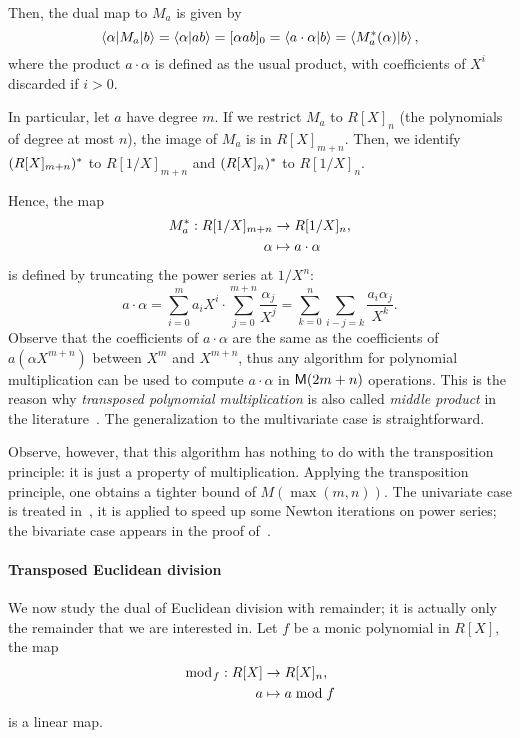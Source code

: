 Then, the dual map to $M_a$ is given by
\begin{equation}
  \label{eq:229}
  \left\langle \alpha \middle| M_a \middle| b \right\rangle = \left\langle \alpha \middle| ab \right\rangle = [\alpha ab]_0 =
  \left\langle a\cdot\alpha \middle| b \right\rangle = \left\langle M_a^\ast(\alpha) \middle| b \right\rangle
  \text{,}
\end{equation}
where the product $a\cdot\alpha$ is defined as the usual product,
with coefficients of $X^i$ discarded if $i>0$.

In particular, let $a$ have degree $m$. If we restrict $M_a$ to
$R[X]_n$ (the polynomials of degree at most $n$), the image of $M_a$
is in $R[X]_{m+n}$. Then, we identify $(R[X]_{m+n})^\ast$ to
$R[1/X]_{m+n}$ and $(R[X]_n)^\ast$ to $R[1/X]_n$. 

Hence, the map 
\begin{equation}
  \label{eq:231}
  \begin{aligned}
    M_a^\ast:R[1/X]_{m+n}&\rightarrow R[1/X]_n\text{,}\\
    \alpha&\mapsto a\cdot\alpha  
  \end{aligned}
\end{equation}
is defined by truncating the power series at $1/X^n$:
\begin{equation}
  \label{eq:230}
  a\cdot\alpha = \sum_{i=0}^ma_iX^i \cdot \sum_{j=0}^{m+n}\frac{\alpha_j}{X^j} =
  \sum_{k=0}^{n}\sum_{i-j=k}\frac{a_i\alpha_j}{X^k}
  \text{.}
\end{equation}
Observe that the coefficients of $a\cdot\alpha$ are the same as the
coefficients of $a(\alpha X^{m+n})$ between $X^{m}$ and $X^{m+n}$,
thus any algorithm for polynomial multiplication can be used to
compute $a\cdot\alpha$ in $\mathsf{M}(2m+n)$ operations. This is the reason
why \emph{transposed polynomial multiplication} is also called
\emph{middle product} in the
literature~\cite{bostan+lecerf+schost:tellegen,hanrot+quercia+zimmermann}.
The generalization to the multivariate case is straightforward.

Observe, however, that this algorithm has nothing to do with the
transposition principle: it is just a property of
multiplication. Applying the transposition principle, one obtains a
tighter bound of $M(\max(m,n))$. The univariate case is treated
in~\cite{hanrot+quercia+zimmermann,bostan+lecerf+schost:tellegen}, it
is applied to speed up some Newton iterations on power series; the
bivariate case appears in the proof
of~\cite[Corollary~2]{pascal+schost06}.

\paragraph{Transposed Euclidean division}
\label{sec:transp-eucl-divis}
We now study the dual of Euclidean division with remainder; it is
actually only the remainder that we are interested in. Let $f$ be a
monic polynomial in $R[X]$, the map 
\begin{equation}
  \label{eq:238}
  \begin{aligned}
    \bmod_f:R[X]&\rightarrow R[X]_n\text{,}\\
    a&\mapsto a\bmod f
  \end{aligned}
\end{equation}
is a linear map.

